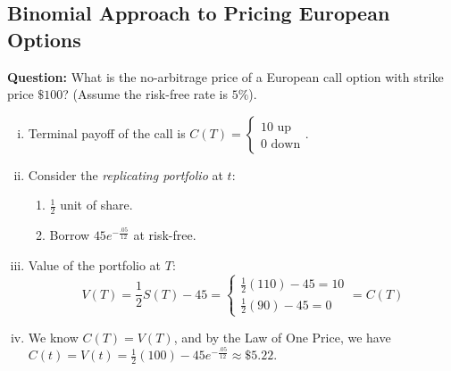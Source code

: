 \subsection{Binomial Approach to Pricing European Options}
\textbf{Question: } What is the no-arbitrage price of a European call option with strike price \(\$100\)? (Assume the risk-free rate is \(5\%\)).
\begin{enumerate}[i.]
    \item Terminal payoff of the call is \(C(T) = \begin{cases}
        10 \text{ up} \\
        0 \text{ down}
    \end{cases}\).

    \item Consider the \textit{replicating portfolio} at \(t\):
    \begin{enumerate}
        \item \(\frac{1}{2}\) unit of share.
        \item Borrow \(45e^{-\frac{.05}{12}}\) at risk-free.
    \end{enumerate}

    \item Value of the portfolio at \(T\):
    \begin{equation*}
        V(T) = \frac{1}{2}S(T) - 45 = \begin{cases}
            \frac{1}{2}(110) - 45 = 10 \\
            \frac{1}{2}(90) - 45 = 0
        \end{cases} = C(T)
    \end{equation*}

    \item We know \(C(T) = V(T)\), and by the Law of One Price, we have \(C(t) = V(t) = \frac{1}{2}(100) - 45e^{-\frac{.05}{12}} \approx \$5.22\).
\end{enumerate}

